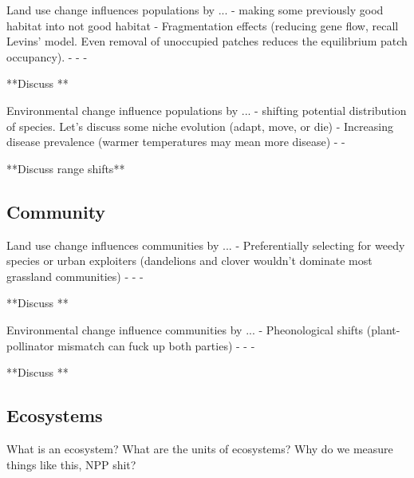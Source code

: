 \documentclass[12pt]{article}
\begin{document}
Land use change influences populations by ...
- making some previously good habitat into not good habitat
- Fragmentation effects (reducing gene flow, recall Levins' model. Even removal of unoccupied patches reduces the equilibrium patch occupancy). 
- 
- 
- 

**Discuss **




Environmental change influence populations by ...
- shifting potential distribution of species. Let's discuss some niche evolution (adapt, move, or die) 
- Increasing disease prevalence (warmer temperatures may mean more disease) 
- 
- 

**Discuss range shifts**
















\bigskip
\subsection*{Community}

Land use change influences communities by ...
- Preferentially selecting for weedy species or urban exploiters (dandelions and clover wouldn't dominate most grassland communities)
- 
- 
- 

**Discuss **



Environmental change influence communities by ...
- Pheonological shifts (plant-pollinator mismatch can fuck up both parties)
- 
- 
- 

**Discuss **





















\bigskip
\subsection*{Ecosystems}

What is an ecosystem? What are the units of ecosystems? Why do we measure things like this, NPP shit?
\end{document}
